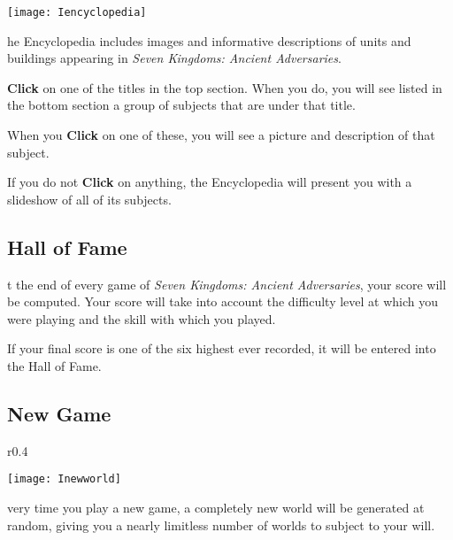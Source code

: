 
\begin{center}
	\texttt{[image: Iencyclopedia]} %
\end{center}

he Encyclopedia includes images and informative descriptions of units and buildings appearing in \textit{Seven Kingdoms: Ancient Adversaries}.

\textbf{Click} on one of the titles in the top section. When you do, you will see listed in the bottom section a group of subjects that are under that title.

When you \textbf{Click} on one of these, you will see a picture and description of that subject.

If you do not \textbf{Click} on anything, the Encyclopedia will present you with a slideshow of all of its subjects.

\subsection{Hall of Fame}



t the end of every game of \textit{Seven Kingdoms: Ancient Adversaries}, your score will be computed. Your score will take into account the difficulty level at which you were playing and the skill with which you played.

If your final score is one of the six highest ever recorded, it will be entered into the Hall of Fame.

\subsection{New Game}

\begin{wrapfigure}{r}{0.4\textwidth}
	\begin{center}
		\vspace{-20pt}
		\texttt{[image: Inewworld]} %
	\end{center}
\vspace{-20pt}
\end{wrapfigure}

very time you play a new game, a completely new world will be generated at random, giving you a nearly limitless number of worlds to subject to your will.

